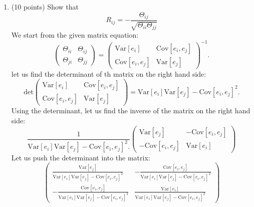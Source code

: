 \documentclass[a3paper,12pt]{extarticle} %
\begin{document}
\begin{enumerate}
    \item (10 points) Show that
    \[
    R_{ij} = -\frac{\Theta_{ij}}{\sqrt{\Theta_{ii} \Theta_{jj}}}
    \]
    We start from the given matrix equation:
    \[
    \begin{pmatrix}
    \Theta_{ii} & \Theta_{ij} \\
    \Theta_{ji} & \Theta_{jj}
    \end{pmatrix}
    =
    \begin{pmatrix}
    \text{Var}[e_i] & \text{Cov}[e_i, e_j] \\
    \text{Cov}[e_i, e_j] & \text{Var}[e_j]
    \end{pmatrix}^{-1}.
    \]
    let us find the determinant of th matrix on the right hand side:
    \[
    \text{det} \begin{pmatrix}
    \text{Var}[e_i] & \text{Cov}[e_i, e_j] \\
    \text{Cov}[e_i, e_j] & \text{Var}[e_j]
    \end{pmatrix} = \text{Var}[e_i] \text{Var}[e_j] - \text{Cov}[e_i, e_j]^2.
    \]
    Using the determinant, let us find the inverse of the matrix on the right hand side:
    \[
    \frac{1}{\text{Var}[e_i] \text{Var}[e_j] - \text{Cov}[e_i, e_j]^2.} \begin{pmatrix}
    \text{Var}[e_j] & -\text{Cov}[e_i, e_j] \\
    -\text{Cov}[e_i, e_j] & \text{Var}[e_i]
    \end{pmatrix}
    \]
    Let us push the determinant into the matrix:
    \[
    \begin{pmatrix}
    \frac{\text{Var}[e_j]}{\text{Var}[e_i] \text{Var}[e_j] - \text{Cov}[e_i, e_j]^2} & -\frac{\text{Cov}[e_i, e_j]}{\text{Var}[e_i] \text{Var}[e_j] - \text{Cov}[e_i, e_j]^2} \\
    -\frac{\text{Cov}[e_i, e_j]}{\text{Var}[e_i] \text{Var}[e_j] - \text{Cov}[e_i, e_j]^2} & \frac{\text{Var}[e_i]}{\text{Var}[e_i] \text{Var}[e_j] - \text{Cov}[e_i, e_j]^2}

\end{pmatrix}\]
\end{enumerate}
\end{document}
